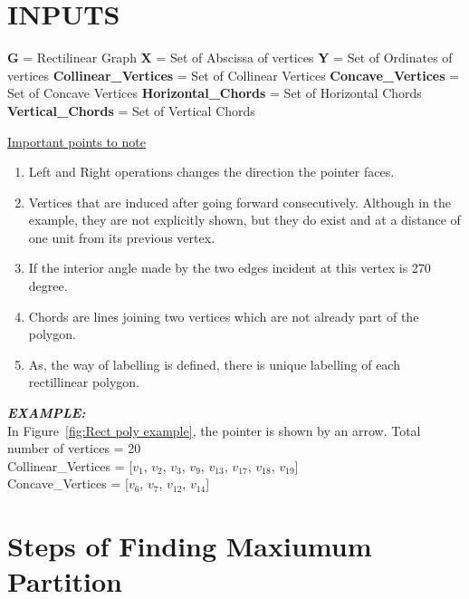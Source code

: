 \section{INPUTS}
\textbf{G} = Rectilinear Graph \newline
\textbf{X} = Set of Abscissa of vertices \newline
\textbf{Y} = Set of Ordinates of vertices \newline
\textbf{Collinear\_Vertices} = Set of Collinear Vertices \newline
\textbf{Concave\_Vertices} = Set of Concave Vertices \newline
\textbf{Horizontal\_Chords} = Set of Horizontal Chords \newline
\textbf{Vertical\_Chords} = Set of Vertical Chords \newline

\underline{Important points to note}
\begin{enumerate}
\item Left and Right operations changes the direction the pointer faces.
\item Vertices that are induced after going forward consecutively. Although in the example, they are not explicitly shown,               but they do exist and at a distance of one unit from its previous vertex.
\item If the interior angle made by the two edges incident at this vertex is 270 degree.
\item Chords are lines joining two vertices which are not already part of the polygon.
\item As, the way of labelling is defined, there is unique labelling of each rectillinear polygon.
\end{enumerate}

\textbf{\emph{EXAMPLE:}}\\
In Figure~\ref{fig:Rect poly example}, the pointer is shown by an arrow. \newline
Total number of vertices = 20 \\
Collinear\_Vertices = [$v_{1}$, $v_{2}$, $v_{3}$, $v_{9}$, $v_{13}$, $v_{17}$, $v_{18}$, $v_{19}$] \\
Concave\_Vertices = [$v_{6}$, $v_{7}$, $v_{12}$, $v_{14}$] \\\*



\pagebreak

\section{Steps of Finding Maxiumum Partition}
